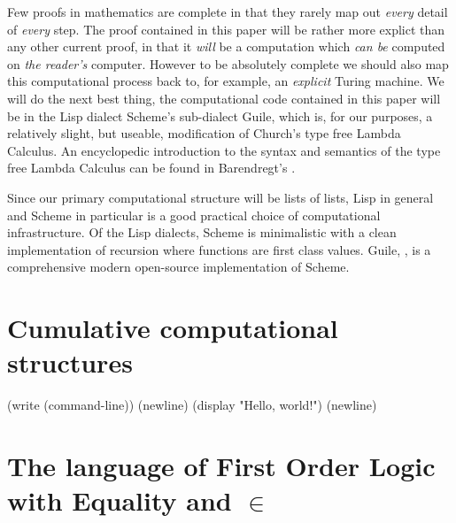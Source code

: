 \documentclass[a4paper,openany]{amsart}
\begin{document}
Few proofs in mathematics are complete in that they rarely map out \emph{every}
detail of \emph{every} step. The proof contained in this paper will be rather
more explict than any other current proof, in that it \emph{will} be a
computation which \emph{can be} computed on \emph{the reader's} computer.
However to be absolutely complete we should also map this computational process
back to, for example, an \emph{explicit} Turing machine. We will do the next
best thing, the computational code contained in this paper will be in the Lisp
dialect Scheme's sub-dialect Guile, which is, for our purposes, a relatively
slight, but useable, modification of Church's type free Lambda Calculus. An
encyclopedic introduction to the syntax and semantics of the type free Lambda
Calculus can be found in Barendregt's \cite{barendregt2012lambdaCalculus}. 

Since our primary computational structure will be lists of lists, Lisp in
general and Scheme in particular is a good practical choice of computational
infrastructure. Of the Lisp dialects, Scheme is minimalistic with a clean
implementation of recursion where functions are first class values. Guile,
\cite{guile2014online, guile2014reference}, is a comprehensive modern
open-source implementation of Scheme.

\section{Cumulative computational structures}

\begin{racket}
(write (command-line))
(newline)
(display "Hello, world!")
(newline)
\end{racket}

\section{The language of First Order Logic with Equality and $\in$}

\printbibliography
\end{document}
